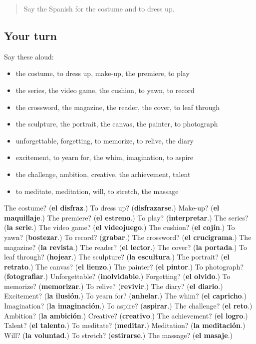 \label{lesson:ES-R767-repaso-760-767}



\begin{quote}
Say the Spanish for the costume and to dress up.
\end{quote}

\subsection*{Your turn}
Say these aloud:

\begin{itemize}
\raggedright
  \item the costume, to dress up, make-up, the premiere, to play
  \item the series, the video game, the cushion, to yawn, to record
  \item the crossword, the magazine, the reader, the cover, to leaf through
  \item the sculpture, the portrait, the canvas, the painter, to photograph
  \item unforgettable, forgetting, to memorize, to relive, the diary
  \item excitement, to yearn for, the whim, imagination, to aspire
  \item the challenge, ambition, creative, the achievement, talent
  \item to meditate, meditation, will, to stretch, the massage
\end{itemize}

\begin{tcolorbox}[breakable,colback=teal!4,colframe=teal!35!black,title={Before you move on}]
The costume? (\textbf{el disfraz}.) To dress up? (\textbf{disfrazarse}.) Make-up? (\textbf{el maquillaje}.) The premiere? (\textbf{el estreno}.) To play? (\textbf{interpretar}.) The series? (\textbf{la serie}.) The video game? (\textbf{el videojuego}.) The cushion? (\textbf{el cojín}.) To yawn? (\textbf{bostezar}.) To record? (\textbf{grabar}.) The crossword? (\textbf{el crucigrama}.) The magazine? (\textbf{la revista}.) The reader? (\textbf{el lector}.) The cover? (\textbf{la portada}.) To leaf through? (\textbf{hojear}.) The sculpture? (\textbf{la escultura}.) The portrait? (\textbf{el retrato}.) The canvas? (\textbf{el lienzo}.) The painter? (\textbf{el pintor}.) To photograph? (\textbf{fotografiar}.) Unforgettable? (\textbf{inolvidable}.) Forgetting? (\textbf{el olvido}.) To memorize? (\textbf{memorizar}.) To relive? (\textbf{revivir}.) The diary? (\textbf{el diario}.) Excitement? (\textbf{la ilusión}.) To yearn for? (\textbf{anhelar}.) The whim? (\textbf{el capricho}.) Imagination? (\textbf{la imaginación}.) To aspire? (\textbf{aspirar}.) The challenge? (\textbf{el reto}.) Ambition? (\textbf{la ambición}.) Creative? (\textbf{creativo}.) The achievement? (\textbf{el logro}.) Talent? (\textbf{el talento}.) To meditate? (\textbf{meditar}.) Meditation? (\textbf{la meditación}.) Will? (\textbf{la voluntad}.) To stretch? (\textbf{estirarse}.) The massage? (\textbf{el masaje}.)
\end{tcolorbox}

